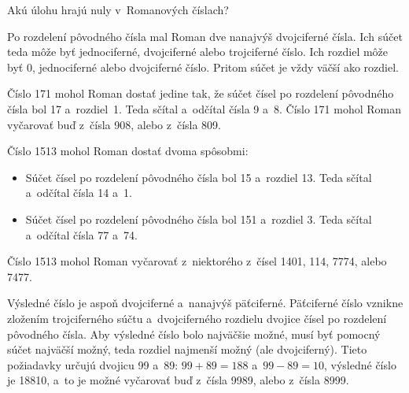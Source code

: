 {%
\napad
Akú úlohu hrajú nuly v~Romanových číslach?

\riesenie
Po rozdelení pôvodného čísla mal Roman dve nanajvýš dvojciferné čísla.
Ich súčet teda môže byť jednociferné, dvojciferné alebo trojciferné číslo.
Ich rozdiel môže byť 0, jednociferné alebo dvojciferné číslo.
Pritom súčet je vždy väčší ako rozdiel.

Číslo 171 mohol Roman dostať jedine tak, že súčet čísel po rozdelení pôvodného čísla bol 17 a~rozdiel~1.
Teda sčítal a~odčítal čísla 9 a~8.
Číslo 171 mohol Roman vyčarovať buď z~čísla 908, alebo z~čísla 809.

Číslo 1513 mohol Roman dostať dvoma spôsobmi:
\begin{itemize}
\item Súčet čísel po rozdelení pôvodného čísla bol 15 a~rozdiel 13.
Teda sčítal a~odčítal čísla 14 a~1.
\item Súčet čísel po rozdelení pôvodného čísla bol 151 a~rozdiel 3.
Teda sčítal a~odčítal čísla 77 a~74.
\end{itemize}
Číslo 1513 mohol Roman vyčarovať z~niektorého z~čísel 1401, 114, 7774, alebo 7477.

Výsledné číslo je aspoň dvojciferné a~nanajvýš päťciferné.
Päťciferné číslo vznikne zložením trojciferného súčtu a~dvojciferného rozdielu dvojice čísel po rozdelení pôvodného čísla.
Aby výsledné číslo bolo najväčšie možné, musí byť pomocný súčet najväčší možný, teda rozdiel najmenší možný (ale dvojciferný).
Tieto požiadavky určujú dvojicu 99 a~89: $99+89=188$ a~$99-89=10$, výsledné číslo je 18810, a~to je možné vyčarovať buď z~čísla 9989, alebo z~čísla 8999.
}

